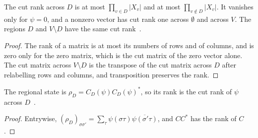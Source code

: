 \begin{lemma}
    \label{lem:sites_cut_rank}
    \leanok
    The cut rank across $D$ is at most $\prod_{v\in D}|X_v|$ and at most
    $\prod_{v\notin D}|X_v|$. It vanishes only for $\psi=0$, and a nonzero vector has
    cut rank one across $\emptyset$ and across $V$. The regions $D$ and $V\setminus D$
    have the same cut rank~\cite{PerezGarcia2007Matrix}.
\end{lemma}
\begin{proof}\leanok
    The rank of a matrix is at most its numbers of rows and of columns, and is zero only
    for the zero matrix, which is the cut matrix of the zero vector alone. The cut matrix
    across $V\setminus D$ is the transpose of the cut matrix across $D$ after relabelling
    rows and columns, and transposition preserves the rank.
\end{proof}

\begin{lemma}
    \label{lem:sites_cut_rank_regional_state}
    \leanok
    The regional state is $\rho_D=C_D(\psi)C_D(\psi)^*$, so its rank is the cut rank of
    $\psi$ across $D$~\cite{PerezGarcia2007Matrix}.
\end{lemma}
\begin{proof}\leanok
    Entrywise, $(\rho_D)_{\sigma\sigma'}=\sum_\tau\psi(\sigma\tau)
    \overline{\psi(\sigma'\tau)}$, and $CC^*$ has the rank of $C$.
\end{proof}

